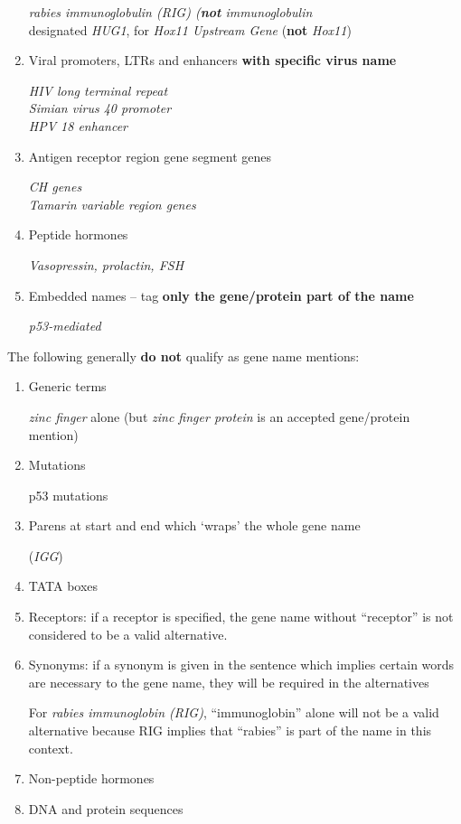 \begin{enumerate}
\emph{rabies immunoglobulin (RIG) (\textbf{not} \emph{immunoglobulin}}\\
designated \emph{HUG1}, for \emph{Hox11 Upstream Gene} (\textbf{not} \emph{Hox11})

\item Viral promoters, LTRs and enhancers \textbf{with specific virus name}

\emph{HIV long terminal repeat\\
Simian virus 40 promoter\\
HPV 18 enhancer}

\item Antigen receptor region gene segment genes

\emph{CH genes\\
Tamarin variable region genes}

\item Peptide hormones

\emph{Vasopressin, prolactin, FSH}

\item Embedded names – tag \textbf{only the gene/protein part of the name}

\emph{p53-mediated}

\end{enumerate}

The following generally \textbf{do not} qualify as gene name mentions:

\begin{enumerate}

\item Generic terms

\emph{zinc finger} alone (but \emph{zinc finger protein} is an accepted gene/protein mention)

\item Mutations

p53 mutations

\item Parens at start and end which `wraps' the whole gene name

(\emph{IGG})

\item TATA boxes

\item Receptors: if a receptor is specified, the gene name without ``receptor'' is not
considered to be a valid alternative.

\item Synonyms: if a synonym is given in the sentence which implies certain words are
necessary to the gene name, they will be required in the alternatives

For \emph{rabies immunoglobin (RIG)}, ``immunoglobin'' alone will not
be a valid alternative because RIG implies that ``rabies'' is part of the name in this
context.

\item Non-peptide hormones

\item DNA and protein sequences

\end{enumerate}
